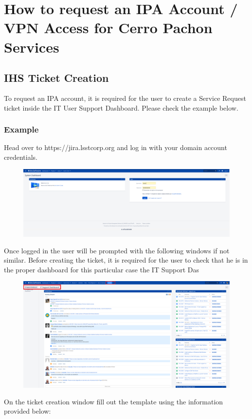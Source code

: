 \newpage

\section{How to request an IPA Account / VPN Access for Cerro Pachon Services}

\subsection{IHS Ticket Creation}
  
  To request an IPA account, it is required for the user to create a Service Request ticket inside the IT User Support Dashboard.
  Please check the example below.

\subsubsection{Example}

  Head over to https://jira.lsstcorp.org and log in with your domain account credentials.

\begin{figure}
  \includegraphics[width=15cm]{Images/example1.png}
  \centering
\end{figure}

\newpage

Once logged in the user will be prompted with the following windows if not similar. Before creating the ticket,  it is required for the user to check that he is in the proper dashboard for this particular case the IT Support Das

\begin{figure}
  \includegraphics[width=15cm]{Images/example2.png}
  \centering
\end{figure}

On the ticket creation window fill out the template using the information provided below:

